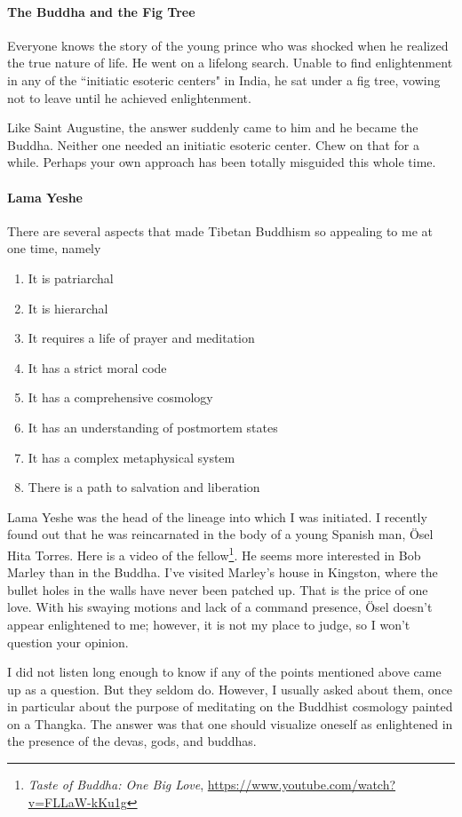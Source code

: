 \paragraph{The Buddha and the Fig Tree}
Everyone knows the story of the young prince who was shocked when he realized the true nature of life. He went on a lifelong search. Unable to find enlightenment in any of the ``initiatic esoteric centers" in India, he sat under a fig tree, vowing not to leave until he achieved enlightenment.

Like Saint Augustine, the answer suddenly came to him and he became the Buddha. Neither one needed an initiatic esoteric center. Chew on that for a while. Perhaps your own approach has been totally misguided this whole time.

\paragraph{Lama Yeshe}
There are several aspects that made Tibetan Buddhism so appealing to me at one time, namely

\begin{enumerate}
\item It is patriarchal 
\item It is hierarchal 
\item It requires a life of prayer and meditation 
\item It has a strict moral code 
\item It has a comprehensive cosmology 
\item It has an understanding of postmortem states 
\item It has a complex metaphysical system 
\item There is a path to salvation and liberation 
\end{enumerate}
Lama Yeshe was the head of the lineage into which I was initiated. I recently found out that he was reincarnated in the body of a young Spanish man, Ösel Hita Torres. Here is a video of the fellow\footnote{\textit{Taste of Buddha: One Big Love}, \url{https://www.youtube.com/watch?v=FLLaW-kKu1g}}. He seems more interested in Bob Marley than in the Buddha. I've visited Marley's house in Kingston, where the bullet holes in the walls have never been patched up. That is the price of one love. With his swaying motions and lack of a command presence, Ösel doesn't appear enlightened to me; however, it is not my place to judge, so I won't question your opinion.

I did not listen long enough to know if any of the points mentioned above came up as a question. But they seldom do. However, I usually asked about them, once in particular about the purpose of meditating on the Buddhist cosmology painted on a Thangka. The answer was that one should visualize oneself as enlightened in the presence of the devas, gods, and buddhas.

